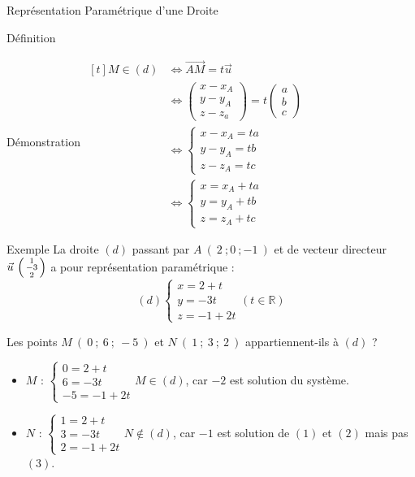 \documentclass{coursbook}
\begin{document}
\begin{Gpartie}{Représentation Paramétrique d'une Droite}
\begin{Spartie}{Définition}
\begin{SSpartie}{Démonstration}
                $\begin{aligned}[t]
                    M\in(d)&\iff\overrightarrow{AM}=t\vec{u} \\
                    &\iff\begin{pmatrix} x-x_A \\ y-y_A \\ z-z_a \end{pmatrix}=t\begin{pmatrix} a \\ b \\ c \end{pmatrix} \\
                    &\iff\begin{cases}x-x_A=ta \\ y-y_A=tb \\ z-z_A= t c \end{cases} \\ %
                    &\iff\begin{cases}x=x_A+ta \\ y=y_A+tb \\ z=z_A+ t c \end{cases}
                \end{aligned}$
            \end{SSpartie}
        \end{Spartie}
        \begin{Spartie}{Exemple} 
            La droite $(d)$ passant par $A~\left(~2~;0~;-1~\right)$ et de vecteur directeur $\vec{u}~\begin{psmallmatrix}1 \\ -3 \\ 2\end{psmallmatrix}$ a pour représentation paramétrique : \[(d)\begin{cases} x=2+t \\ y=-3t \\ z=-1+2t
            \end{cases}\left(t\in\mathbb{R}\right)\]

            Les points $M~\left(~0~;~6~;~-5~\right)$ et $N~\left(~1~;~3~;~2~\right)$ appartiennent-ils à $(d)$ ?
            \begin{itemize}
                \item $M$ : $\begin{cases} 0=2+t \\ 6=-3t \\ -5=-1+2t \end{cases}M\in(d)$, car $-2$ est solution du système.
                \item $N$ : $\begin{cases} 1=2+t \\ 3=-3t \\ 2=-1+2t \end{cases}N\notin(d)$, car $-1$ est solution de $(1)$ et $(2)$ mais pas $(3)$.
            \end{itemize}
        \end{Spartie}
    \end{Gpartie}
\end{document}
